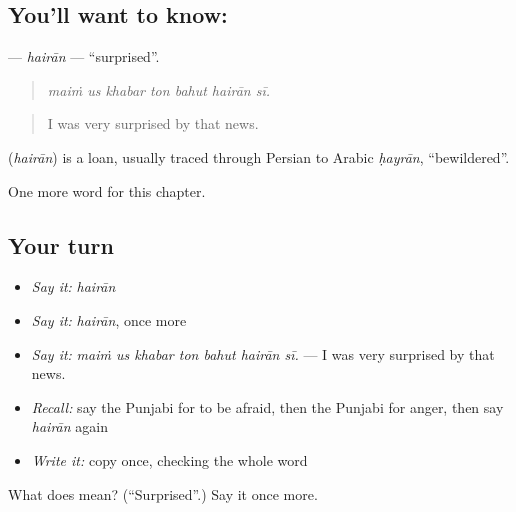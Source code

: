 \subsection*{You'll want to know: }
\textbf{} — \emph{hairān} — \textquotedblleft{}surprised\textquotedblright{}.

\begin{quote}
      
\end{quote}

\begin{quote}
\emph{maiṁ us khabar ton bahut hairān sī.}
\end{quote}

\begin{quote}
I was very surprised by that news.
\end{quote}

\begin{cousinweb}
\textbf{} (\emph{hairān}) is a loan, usually traced through Persian to Arabic \emph{ḥayrān}, \textquotedblleft{}bewildered\textquotedblright{}.
\end{cousinweb}

\begin{grammarlens}[title={What you've built}]
One more word for this chapter.
\end{grammarlens}

\subsection*{Your turn}
\begin{itemize}
\raggedright
  \item \emph{Say it:} \emph{hairān}
  \item \emph{Say it:} \emph{hairān}, once more
  \item \emph{Say it:} \emph{maiṁ us khabar ton bahut hairān sī.} — I was very surprised by that news.
  \item \emph{Recall:} say the Punjabi for to be afraid, then the Punjabi for anger, then say \emph{hairān} again
  \item \emph{Write it:} copy \textbf{} once, checking the whole word
\end{itemize}

\begin{tcolorbox}[breakable,colback=teal!4,colframe=teal!35!black,title={Before you move on}]
What does  mean? (\textquotedblleft{}Surprised\textquotedblright{}.) Say it once more.
\end{tcolorbox}
